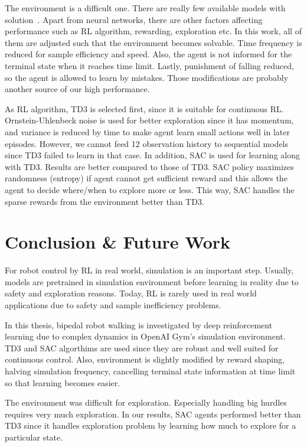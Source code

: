 \documentclass[a4paper, 12pt]{article} %
\begin{document}
The environment is a difficult one. 
There are really few available models with solution~\cite{noauthor_gymleaderboard_2021}. 
Apart from neural networks, there are other factors affecting performance such as RL algorithm, rewarding, exploration etc. 
In this work, all of them are adjusted such that the environment becomes solvable. 
Time frequency is reduced for sample efficiency and speed. 
Also, the agent is not informed for the terminal state when it reaches time limit. 
Lastly, punishment of falling reduced, so the agent is allowed to learn by mistakes. 
Those modifications are probably another source of our high performance. 

As RL algorithm, TD3 is selected first, since it is suitable for continuous RL. 
Ornstein-Uhlenbeck noise is used for better exploration since it has momentum, and variance is reduced by time to make agent learn small actions well in later episodes. 
However, we cannot feed 12 observation history to sequential models since TD3 failed to learn in that case.
In addition, SAC is used for learning along with TD3. 
Results are better compared to those of TD3. 
SAC policy maximizes randomness (entropy) if agent cannot get sufficient reward and this allows the agent to decide where/when to explore more or less. 
This way, SAC handles the sparse rewards from the environment better than TD3. 

\section{Conclusion \& Future Work}

For robot control by RL in real world, simulation is an important step. 
Usually, models are pretrained in simulation environment before learning in reality due to safety and exploration reasons. 
Today, RL is rarely used in real world applications due to safety and sample inefficiency problems. 

In this thesis, bipedal robot walking is investigated by deep  reinforcement learning due to complex dynamics in OpenAI Gym's simulation environment. 
TD3 and SAC algorthims are used since they are robust and well suited for continuous control. 
Also, environment is slightly modified by reward shaping, halving simulation frequency, cancelling terminal state information at time limit so that learning becomes easier.

The environment was difficult for exploration. 
Especially handling big hurdles requires very much exploration.
In our results, SAC agents performed better than TD3 since it handles exploration problem by learning how much to explore for a particular state. 
\end{document}
